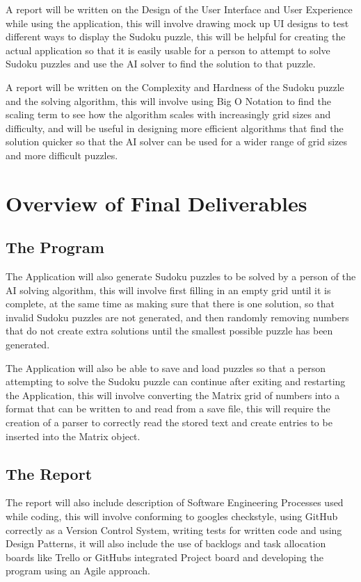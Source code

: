 \documentclass[]{final_report}
\begin{document}
A report will be written on the Design of the User Interface and User Experience while using the application, this will involve drawing mock up UI designs to test different ways to display the Sudoku puzzle, this will be helpful for creating the actual application so that it is easily usable for a person to attempt to solve Sudoku puzzles and use the AI solver to find the solution to that puzzle.

A report will be written on the Complexity and Hardness of the Sudoku puzzle and the solving algorithm, this will involve using Big O Notation to find the scaling term to see how the algorithm scales with increasingly grid sizes and difficulty, and will be useful in designing more efficient algorithms that find the solution quicker so that the AI solver can be used for a wider range of grid sizes and more difficult puzzles.

\section*{Overview of Final Deliverables}

\subsection*{The Program}

The Application will also generate Sudoku puzzles to be solved by a person of the AI solving algorithm, this will involve first filling in an empty grid until it is complete, at the same time as making sure that there is one solution, so that invalid Sudoku puzzles are not generated, and then randomly removing numbers that do not create extra solutions until the smallest possible puzzle has been generated.

The Application will also be able to save and load puzzles so that a person attempting to solve the Sudoku puzzle can continue after exiting and restarting the Application, this will involve converting the Matrix grid of numbers into a format that can be written to and read from a save file, this will require the creation of a parser to correctly read the stored text and create entries to be inserted into the Matrix object.

\subsection*{The Report}

The report will also include description of Software Engineering Processes used while coding, this will involve conforming to googles checkstyle, using GitHub correctly as a Version Control System, writing tests for written code and using Design Patterns, it will also include the use of backlogs and task allocation boards like Trello or GitHubs integrated Project board and developing the program using an Agile approach.
\end{document}
